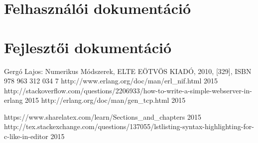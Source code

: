 \documentclass{elteikthesis}
\begin{document}
\chapter{Felhasználói dokumentáció}


\chapter{Fejlesztői dokumentáció}



\begin{thebibliography}{9}
Gergó Lajos: Numerikus Módszerek, ELTE EÖTVÖS KIADÓ, 2010, [329], ISBN 978 963 312 034 7
 {http://www.erlang.org/doc/man/erl\_nif.html} 2015
 {http://stackoverflow.com/questions/2206933/how-to-write-a-simple-webserver-in-erlang}
2015
 {http://erlang.org/doc/man/gen\_tcp.html}
2015


\bibitem{} {https://www.sharelatex.com/learn/Sections\_and\_chapters} 
2015
\bibitem{} {http://tex.stackexchange.com/questions/137055/lstlisting-syntax-highlighting-for-c-like-in-editor} 2015

\end{thebibliography}
\end{document}
